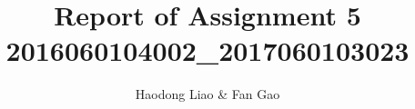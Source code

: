 \documentclass{article}
\title{Report of Assignment 5\\2016060104002\_2017060103023}
\author{Haodong Liao \& Fan Gao}
\begin{document}
\maketitle{}











\end{document}
